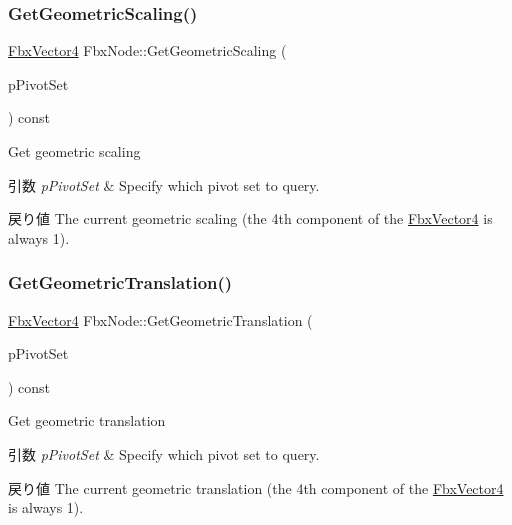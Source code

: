 \subsubsection{\texorpdfstring{Get\+Geometric\+Scaling()}{GetGeometricScaling()}}
{\footnotesize\ttfamily \hyperlink{class_fbx_vector4}{Fbx\+Vector4} Fbx\+Node\+::\+Get\+Geometric\+Scaling (\begin{DoxyParamCaption}\item[{\hyperlink{class_fbx_node_ae62b7311ac4727654cdf1ebd5cbf7343}{E\+Pivot\+Set}}]{p\+Pivot\+Set }\end{DoxyParamCaption}) const}

Get geometric scaling 
\begin{DoxyParams}{引数}
{\em p\+Pivot\+Set} & Specify which pivot set to query. \\
\hline
\end{DoxyParams}
\begin{DoxyReturn}{戻り値}
The current geometric scaling (the 4th component of the \hyperlink{class_fbx_vector4}{Fbx\+Vector4} is always 1). 
\end{DoxyReturn}
\mbox{\label{class_fbx_node_a28af23771e1224b0e8a175e67f4f27f9}} 
\subsubsection{\texorpdfstring{Get\+Geometric\+Translation()}{GetGeometricTranslation()}}
{\footnotesize\ttfamily \hyperlink{class_fbx_vector4}{Fbx\+Vector4} Fbx\+Node\+::\+Get\+Geometric\+Translation (\begin{DoxyParamCaption}\item[{\hyperlink{class_fbx_node_ae62b7311ac4727654cdf1ebd5cbf7343}{E\+Pivot\+Set}}]{p\+Pivot\+Set }\end{DoxyParamCaption}) const}

Get geometric translation 
\begin{DoxyParams}{引数}
{\em p\+Pivot\+Set} & Specify which pivot set to query. \\
\hline
\end{DoxyParams}
\begin{DoxyReturn}{戻り値}
The current geometric translation (the 4th component of the \hyperlink{class_fbx_vector4}{Fbx\+Vector4} is always 1). 
\end{DoxyReturn}
\mbox{\label{class_fbx_node_ad468c7358b16812dd56efe9255dfc355}} 
